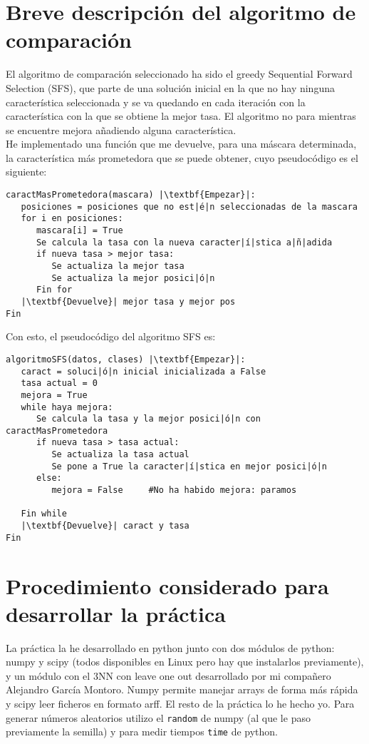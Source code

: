 \documentclass[12pt]{article}
\begin{document}
\section{Breve descripción del algoritmo de comparación}
El algoritmo de comparación seleccionado ha sido el greedy Sequential Forward Selection (SFS), que parte de una solución inicial en la que no hay ninguna característica seleccionada y se va quedando en cada iteración con la característica con la que se obtiene la mejor tasa. El algoritmo no para mientras se encuentre mejora añadiendo alguna característica.\\
He implementado una función que me devuelve, para una máscara determinada, la característica más prometedora que se puede obtener, cuyo pseudocódigo es el siguiente:
\begin{lstlisting}
caractMasPrometedora(mascara) |\textbf{Empezar}|:
   posiciones = posiciones que no est|é|n seleccionadas de la mascara
   for i en posiciones:
      mascara[i] = True
      Se calcula la tasa con la nueva caracter|í|stica a|ñ|adida
      if nueva tasa > mejor tasa:
         Se actualiza la mejor tasa
         Se actualiza la mejor posici|ó|n
      Fin for
   |\textbf{Devuelve}| mejor tasa y mejor pos
Fin
\end{lstlisting}

Con esto, el pseudocódigo del algoritmo SFS es:
\begin{lstlisting}
algoritmoSFS(datos, clases) |\textbf{Empezar}|:
   caract = soluci|ó|n inicial inicializada a False
   tasa actual = 0
   mejora = True
   while haya mejora:
      Se calcula la tasa y la mejor posici|ó|n con caractMasPrometedora
      if nueva tasa > tasa actual:
         Se actualiza la tasa actual
         Se pone a True la caracter|í|stica en mejor posici|ó|n
      else:
         mejora = False		#No ha habido mejora: paramos
      
   Fin while
   |\textbf{Devuelve}| caract y tasa
Fin

\end{lstlisting}

\newpage

\section{Procedimiento considerado para desarrollar la práctica}
La práctica la he desarrollado en python junto con dos módulos de python: numpy y scipy (todos disponibles en Linux pero hay que instalarlos previamente), y un módulo con el 3NN con leave one out desarrollado por mi compañero Alejandro García Montoro. Numpy permite manejar arrays de forma más rápida y scipy leer ficheros en formato arff. El resto de la práctica lo he hecho yo. Para generar números aleatorios utilizo el \texttt{random} de numpy (al que le paso previamente la semilla) y para medir tiempos \texttt{time} de python.\\
\end{document}

